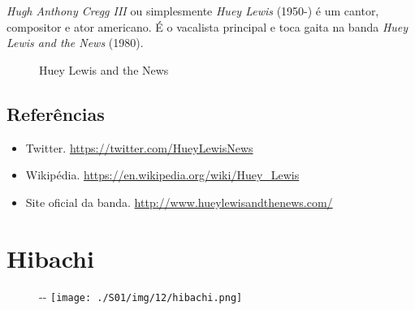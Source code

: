 \emph{Hugh Anthony Cregg III} ou simplesmente \emph{Huey Lewis} (1950-)
é um cantor, compositor e ator americano. É o vacalista principal e toca
gaita na banda \emph{Huey Lewis and the News} (1980).

\begin{figure}
  \centering
    \caption{Huey Lewis and the News\label{fig:huey-lewis-and-the-news}}
\end{figure}

\hypertarget{referuxeancias-2}{%
\subsection{Referências}\label{referuxeancias-2}}

\begin{itemize}
\tightlist
\item
  \sloppy Twitter. \url{https://twitter.com/HueyLewisNews}
\item
  \sloppy Wikipédia. \url{https://en.wikipedia.org/wiki/Huey_Lewis}
\item
  \sloppy Site oficial da banda. \url{http://www.hueylewisandthenews.com/}
\end{itemize}

\hypertarget{hibachi}{%
\section{Hibachi}\label{hibachi}}

\begin{figure}[!ht]
  \begin{adjustwidth}{-\oddsidemargin-1in}{-\rightmargin}
    \centering
    \texttt{[image: ./S01/img/12/hibachi.png]}
  \end{adjustwidth}
\end{figure}

